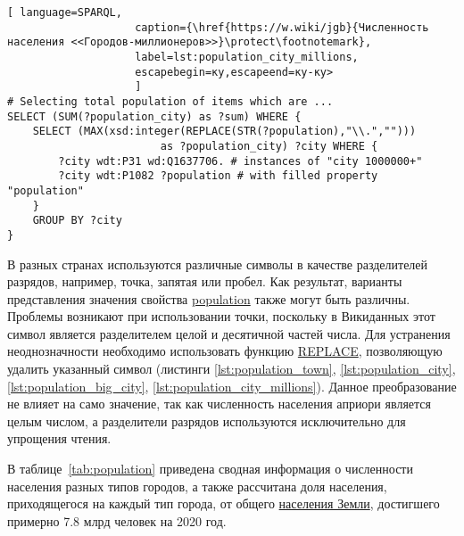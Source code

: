 \begin{lstlisting}[ language=SPARQL, 
                    caption={\href{https://w.wiki/jgb}{Численность населения <<Городов-миллионеров>>}\protect\footnotemark},
                    label=lst:population_city_millions, 
                    escapebegin=ку,escapeend=ку-ку>
                    ]
# Selecting total population of items which are ...
SELECT (SUM(?population_city) as ?sum) WHERE {
	SELECT (MAX(xsd:integer(REPLACE(STR(?population),"\\.",""))) 
						as ?population_city) ?city WHERE {
		?city wdt:P31 wd:Q1637706. # instances of "city 1000000+"
		?city wdt:P1082 ?population # with filled property "population"
	}
	GROUP BY ?city
}
\end{lstlisting}

В разных странах используются различные символы в качестве разделителей разрядов, например, точка, запятая или пробел. Как результат, варианты представления значения свойства \href{https://www.wikidata.org/wiki/Property:P1082}{population} также могут быть различны. Проблемы возникают при использовании точки, поскольку в Викиданных этот символ является разделителем целой и десятичной частей числа. Для устранения неоднозначности необходимо использовать функцию \href{https://en.wikibooks.org/wiki/SPARQL/Expressions\_and\_Functions\#REPLACE}{REPLACE}, позволяющую удалить указанный символ (листинги \ref{lst:population_town}, \ref{lst:population_city}, \ref{lst:population_big_city}, \ref{lst:population_city_millions}). Данное преобразование не влияет на само значение, так как численность населения априори является целым числом, а разделители разрядов используются исключительно для упрощения чтения.

В таблице~\ref{tab:population} приведена сводная информация о численности населения разных типов городов, а также рассчитана доля населения, приходящегося на каждый тип города, от общего \href{https://bit.ly/3pgnMss}{населения Земли}, достигшего примерно \num{7,8} млрд человек на 2020 год.

